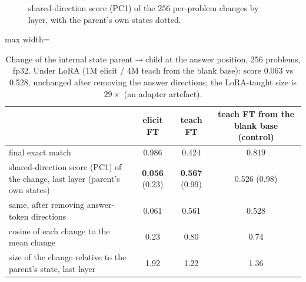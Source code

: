 \documentclass[11pt]{article}
\begin{document}
\begin{enumerate}[label=\textbf{M\arabic*}, leftmargin=*, itemsep=1.2em, resume]
\begin{figure}[h]
{shared-direction score (PC1) of the 256 per-problem changes by layer, with the parent's own states
dotted.}
\label{fig:resid}
\end{figure}
\begin{table}[h]\centering\small
\begin{adjustbox}{max width=\textwidth}
\begin{tabular}{lccc}
\toprule
 & \textbf{elicit FT} & \textbf{teach FT} & teach FT from the blank base (control) \\
\midrule
final exact match & 0.986 & 0.424 & 0.819 \\
shared-direction score (PC1) of the change, last layer (parent's own states) & \textbf{0.056} (0.23) & \textbf{0.567} (0.99) & 0.526 (0.98) \\
same, after removing answer-token directions & 0.061 & 0.561 & 0.528 \\
cosine of each change to the mean change & 0.23 & 0.80 & 0.74 \\
size of the change relative to the parent's state, last layer & 1.92 & 1.22 & 1.36 \\
\bottomrule
\end{tabular}
\end{adjustbox}
\caption{Change of the internal state parent$\to$child at the answer position, 256 problems,
fp32. Under LoRA (1M elicit / 4M teach from the blank base): score 0.063 vs 0.528, unchanged
after removing the answer directions; the LoRA-taught size is $29\times$ (an adapter artefact).}
\label{tab:resid}
\end{table}

\end{enumerate}
\end{document}
